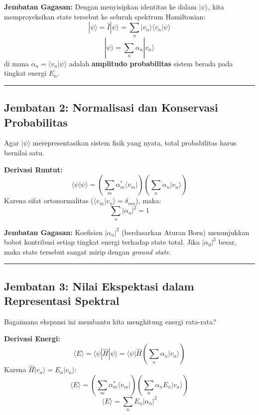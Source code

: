 \textbf{Jembatan Gagasan:} Dengan menyisipkan identitas ke dalam \(|\psi\rangle\), kita memproyeksikan state tersebut ke seluruh spektrum Hamiltonian: \[ |\psi\rangle = \hat{I} |\psi\rangle = \sum_n |v_n\rangle \langle v_n | \psi \rangle \] \[ |\psi\rangle = \sum_n \alpha_n |v_n\rangle \] di mana \(\alpha_n = \langle v_n | \psi \rangle\) adalah \textbf{amplitudo probabilitas} sistem berada pada tingkat energi \(E_n\).

\begin{center}\rule{0.5\linewidth}{0.5pt}\end{center}

\hypertarget{jembatan-2-normalisasi-dan-konservasi-probabilitas}{%
\subsection{Jembatan 2: Normalisasi dan Konservasi Probabilitas}\label{jembatan-2-normalisasi-dan-konservasi-probabilitas}}

Agar \(|\psi\rangle\) merepresentasikan sistem fisik yang nyata, total probabilitas harus bernilai satu.

\textbf{Derivasi Runtut:} \[ \langle \psi | \psi \rangle = \left( \sum_m \alpha_m^* \langle v_m | \right) \left( \sum_n \alpha_n |v_n\rangle \right) \] Karena sifat ortonormalitas (\(\langle v_m | v_n \rangle = \delta_{mn}\)), maka: \[ \sum_n |\alpha_n|^2 = 1 \]

\textbf{Jembatan Gagasan:} Koefisien \(|\alpha_n|^2\) (berdasarkan Aturan Born) menunjukkan bobot kontribusi setiap tingkat energi terhadap state total. Jika \(|\alpha_0|^2\) besar, maka state tersebut sangat mirip dengan \emph{ground state}.

\begin{center}\rule{0.5\linewidth}{0.5pt}\end{center}

\hypertarget{jembatan-3-nilai-ekspektasi-dalam-representasi-spektral}{%
\subsection{Jembatan 3: Nilai Ekspektasi dalam Representasi Spektral}\label{jembatan-3-nilai-ekspektasi-dalam-representasi-spektral}}

Bagaimana ekspansi ini membantu kita menghitung energi rata-rata?

\textbf{Derivasi Energi:} \[ \langle E \rangle = \langle \psi | \hat{H} | \psi \rangle = \langle \psi | \hat{H} \left( \sum_n \alpha_n |v_n\rangle \right) \] Karena \(\hat{H} |v_n\rangle = E_n |v_n\rangle\): \[ \langle E \rangle = \left( \sum_m \alpha_m^* \langle v_m | \right) \left( \sum_n \alpha_n E_n |v_n\rangle \right) \] \[ \langle E \rangle = \sum_n E_n |\alpha_n|^2 \]

